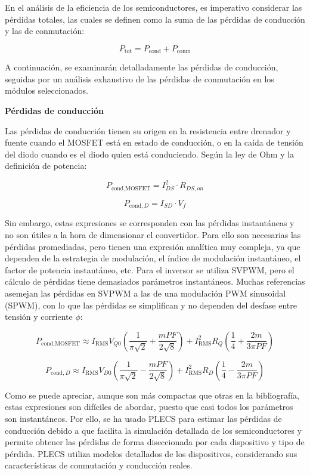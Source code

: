 En el análisis de la eficiencia de los semiconductores, es imperativo considerar las pérdidas totales, las cuales se definen como la suma de las pérdidas de conducción y las de conmutación:

\[ P_{\text{tot}} = P_{\text{cond}} + P_{\text{conm}} \]

A continuación, se examinarán detalladamente las pérdidas de conducción, seguidas por un análisis exhaustivo de las pérdidas de conmutación en los módulos seleccionados.


\textbf{Pérdidas de conducción}

Las pérdidas de conducción tienen su origen en la resistencia entre drenador y fuente cuando el MOSFET está en estado de conducción, o en la caída de tensión del diodo cuando es el diodo quien está conduciendo. Según la ley de Ohm y la definición de potencia:

\[
P_{\text{cond,MOSFET}}= I_{DS}^2\cdot R_{DS, on}
\]

\[
P_{\text{cond},D} = I_{SD}\cdot V_f
\]

Sin embargo, estas expresiones se corresponden con las pérdidas instantáneas y no son útiles a la hora de dimensionar el convertidor. Para ello son necesarias las pérdidas promediadas, pero tienen una expresión analítica muy compleja, ya que dependen de la estrategia de modulación, el índice de modulación instantáneo, el factor de potencia instantáneo, etc. Para el inversor se utiliza SVPWM, pero el cálculo de pérdidas tiene demasiados parámetros instantáneos. Muchas referencias asemejan las pérdidas en SVPWM a las de una modulación PWM sinusoidal (SPWM), con lo que las pérdidas se simplifican y no dependen del desfase entre tensión y corriente $\phi$:

\[
P_{\text{cond,MOSFET}} \approx I_{\text{RMS}} V_{Q0} \left(\frac{1}{\pi\sqrt{2}} + \frac{m PF}{2\sqrt{8}}\right) + I_{\text{RMS}}^2 R_Q \left(\frac{1}{4} + \frac{2m}{3\pi PF}\right)
\]

\[
P_{\text{cond},D} \approx I_{\text{RMS}} V_{D0} \left(\frac{1}{\pi\sqrt{2}} - \frac{m PF}{2\sqrt{8}}\right) + I_{\text{RMS}}^2 R_D \left(\frac{1}{4} - \frac{2m}{3\pi PF}\right)
\]

Como se puede apreciar, aunque son más compactas que otras en la bibliografía, estas expresiones son difíciles de abordar, puesto que casi todos los parámetros son instantáneos. Por ello, se ha usado PLECS para estimar las pérdidas de conducción debido a que facilita la simulación detallada de los semiconductores y permite obtener las pérdidas de forma diseccionada por cada dispositivo y tipo de pérdida. PLECS utiliza modelos detallados de los dispositivos, considerando sus características de conmutación y conducción reales.

